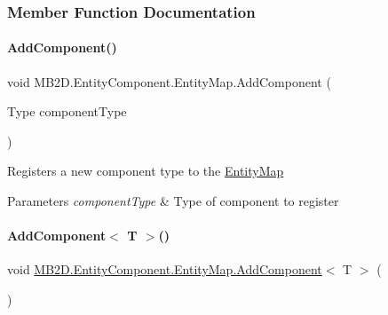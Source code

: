 \subsubsection{Member Function Documentation}
\hypertarget{class_m_b2_d_1_1_entity_component_1_1_entity_map_aff9e50266b46d782c31c5b482b86540c}{}\label{class_m_b2_d_1_1_entity_component_1_1_entity_map_aff9e50266b46d782c31c5b482b86540c} 
\paragraph{\texorpdfstring{Add\+Component()}{AddComponent()}}
{\footnotesize\ttfamily void M\+B2\+D.\+Entity\+Component.\+Entity\+Map.\+Add\+Component (\begin{DoxyParamCaption}\item[{Type}]{component\+Type }\end{DoxyParamCaption})\hspace{0.3cm}{\ttfamily [inline]}}



Registers a new component type to the \hyperlink{class_m_b2_d_1_1_entity_component_1_1_entity_map}{Entity\+Map} 


\begin{DoxyParams}{Parameters}
{\em component\+Type} & Type of component to register\\
\hline
\end{DoxyParams}
\hypertarget{class_m_b2_d_1_1_entity_component_1_1_entity_map_a3832e5a6ae181f71d002e81caf008da4}{}\label{class_m_b2_d_1_1_entity_component_1_1_entity_map_a3832e5a6ae181f71d002e81caf008da4} 
\paragraph{\texorpdfstring{Add\+Component$<$ T $>$()}{AddComponent< T >()}}
{\footnotesize\ttfamily void \hyperlink{class_m_b2_d_1_1_entity_component_1_1_entity_map_aff9e50266b46d782c31c5b482b86540c}{M\+B2\+D.\+Entity\+Component.\+Entity\+Map.\+Add\+Component}$<$ T $>$ (\begin{DoxyParamCaption}{ }\end{DoxyParamCaption})\hspace{0.3cm}{\ttfamily [inline]}}



